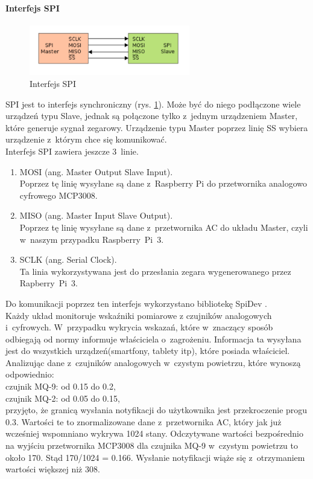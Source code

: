 \paragraph{Interfejs SPI}
\begin{figure}[ht]
	\centering
	\includegraphics[width=7cm]{SPI.png}
	\caption{Interfejs SPI \protect\cite{spi}}
	\label{spi}
\end{figure}
SPI jest to interfejs synchroniczny (rys. \ref{spi}). Może być do niego podłączone wiele urządzeń typu Slave, jednak są połączone tylko z~jednym urządzeniem Master, które generuje sygnał zegarowy. Urządzenie typu Master poprzez linię SS wybiera urządzenie z~którym chce się komunikować. \\
Interfejs SPI zawiera jeszcze 3~linie.
\begin{enumerate} 
\item MOSI (ang. Master Output Slave Input). \\
Poprzez tę linię wysyłane są dane z~Raspberry Pi do przetwornika analogowo cyfrowego MCP3008.
\item MISO (ang. Master Input Slave Output).\\
Poprzez tę linię wysyłane są dane z~przetwornika AC do układu Master, czyli w~naszym przypadku Raspberry~Pi~3.
\item SCLK (ang. Serial Clock).\\
Ta linia wykorzystywana jest do przesłania zegara wygenerowanego przez Rapberry~Pi~3.
\end{enumerate}
Do komunikacji poprzez ten interfejs wykorzystano bibliotekę SpiDev \cite{spidev}. \\
Każdy układ monitoruje wskaźniki pomiarowe z czujników analogowych i~cyfrowych. W~przypadku wykrycia wskazań, które w~znaczący sposób odbiegają od normy informuje właściciela o~zagrożeniu. Informacja ta wysyłana jest do wszystkich urządzeń(smartfony, tablety itp), które posiada właściciel.  Analizując dane z~czujników analogowych w~czystym powietrzu, które wynoszą odpowiednio:\\
czujnik MQ-9: od 0.15 do 0.2,\\
czujnik MQ-2: od 0.05 do 0.15,\\
przyjęto, że granicą wysłania notyfikacji do użytkownika jest przekroczenie progu 0.3. Wartości te to znormalizowane dane z~przetwornika AC, który jak już wcześniej wspomniano wykrywa 1024 stany. Odczytywane wartości bezpośrednio na wyjściu przetwornika MCP3008 dla czujnika MQ-9 w~czystym powietrzu to około 170. Stąd 170/1024 = 0.166. Wysłanie notyfikacji wiąże się z~otrzymaniem wartości większej niż 308.

